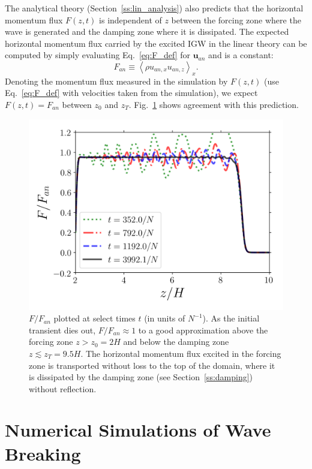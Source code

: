 \documentclass[
        fleqn,
        usenatbib,
    ]{mnras}
\newcommand*{\ev}[1]{\left\langle#1\right\rangle}
\newcommand*{\bm}[1]{\mathbf{#1}}
\begin{document}
The analytical theory (Section~\ref{ss:lin_analysis}) also predicts that the
horizontal momentum flux $F(z, t)$ is independent of $z$ between the forcing
zone where the wave is generated and the damping zone where it is dissipated.
The expected horizontal momentum flux carried by the excited IGW in the linear
theory can be computed by simply evaluating Eq.~\eqref{eq:F_def} for
$\bm{u}_{an}$ and is a constant:
\begin{equation}
    F_{an} \equiv \ev{\rho u_{an, x} u_{an, z}}_x.\label{eq:F_al}
\end{equation}
Denoting the momentum flux measured in the simulation by $F(z, t)$
(use Eq.~\eqref{eq:F_def} with velocities taken from the simulation), we expect
$F(z, t) = F_{an}$ between $z_0$ and $z_T$. Fig.~\ref{fig:lin_fluxes} shows
agreement with this prediction.
\begin{figure}
    \centering
    \includegraphics[width=0.9\columnwidth]{plots/lin_fluxes.png}
    \caption{$F/F_{an}$ plotted at select times $t$ (in units of
    $N^{-1}$). As the initial transient dies out, $F / F_{an} \approx 1$ to a
    good approximation above the forcing zone $z > z_0 = 2H$ and below the
    damping zone $z \lesssim z_T = 9.5H$. The horizontal momentum flux excited
    in the forcing zone is transported without loss to the top of the domain,
    where it is dissipated by the damping zone (see Section~\ref{ss:damping})
    without reflection.}\label{fig:lin_fluxes}
\end{figure}

\section{Numerical Simulations of Wave Breaking}\label{s:sim}
\end{document}
